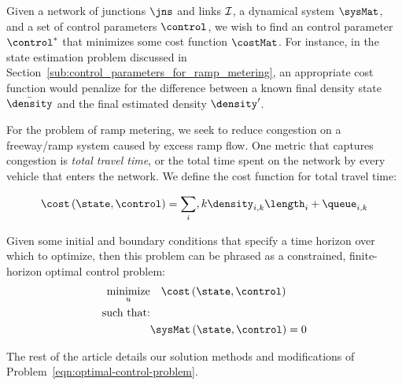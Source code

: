 



Given a network of junctions $\jns$ and links $\mathcal{I}$, a dynamical system $\sysMat$, and a set of control parameters $\control$, we wish to find an control parameter $\control^*$ that minimizes some cost function $\costMat$. For instance, in the state estimation problem discussed in Section~\ref{sub:control_parameters_for_ramp_metering}, an appropriate cost function would penalize for the difference between a known final density state $\bar{\density}$ and the final estimated density $\density'$.

For the problem of ramp metering, we seek to reduce congestion on a freeway/ramp system caused by excess ramp flow. One metric that captures congestion is \emph{total travel time}, or the total time spent on the network by every vehicle that enters the network. We define the cost function for total travel time:

\begin{equation}
    \label{eqn:total-travel-time}
    \cost\left(\state,\control\right) = \sum_i,k \idx{\density}{i}{k}\length_i + \idx{\queue}{i}{k}
\end{equation}

Given some initial and boundary conditions that specify a time horizon over which to optimize, then this problem can be phrased as a constrained, finite-horizon optimal control problem:
\begin{equation}
\begin{aligned}
\label{eqn:optimal-control-problem}
\underset{u}{\text{minimize}} & \quad \cost\left(\state,\control\right) \\
\text{such that:} & \\
& \sysMat \left(\state, \control\right) = 0
\end{aligned}
\end{equation}

The rest of the article details our solution methods and modifications of Problem~\eqref{eqn:optimal-control-problem}.